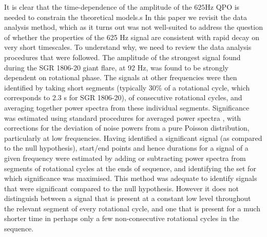 \documentclass{emulateapj}
\begin{document}
It is clear that the time-dependence of the amplitude of the $625$Hz QPO is needed
to constrain the theoretical models.s
In this paper we  revisit the data analysis method, which as it turns out was not well-suited to address the question of whether the properties of the 625 Hz signal are consistent with rapid decay on very short timescales.
To understand why, we need to review the data analysis procedures that were followed. The amplitude of the strongest signal found during the SGR 1806-20 giant flare, at 92 Hz, was found to be strongly dependent on rotational phase. The signals at other frequencies were then identified by taking short segments (typically 30\% of a rotational cycle, which corresponds to 2.3 s for SGR 1806-20), of consecutive rotational cycles, and averaging together power spectra from these individual segments. Significance was estimated using standard procedures for averaged power spectra \citep{vanderKlis89}, with corrections for the deviation of noise powers from a pure Poisson distribution, particularly at low frequencies. Having identified a significant signal (as compared to the null hypothesis), start/end points and hence durations for a signal of a given frequency were estimated by adding or subtracting power spectra from segments of rotational cycles at the ends of sequence, and identifying the set for which significance was maximised. This method was adequate to identify signals that were significant compared to the null hypothesis. However it does not distinguish between a signal that is present at a constant low level throughout the relevant segment of every rotational cycle, and one that is present for a much shorter time in perhaps only a few non-consecutive rotational cycles in the sequence.
\end{document}
